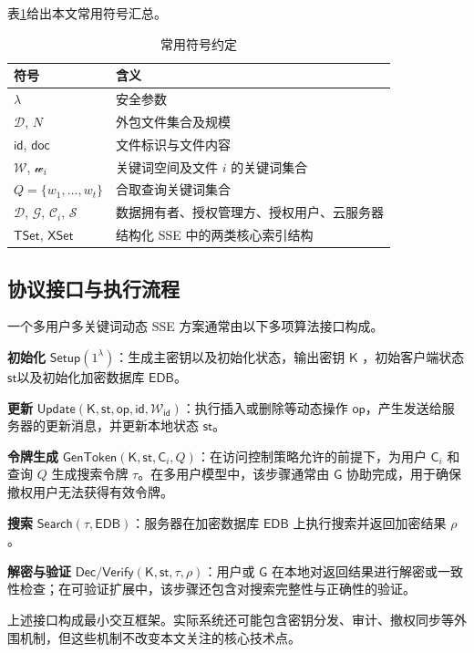 表\ref{tab:notation}给出本文常用符号汇总。
\begin{table}[t]
\centering
\caption{常用符号约定}
\label{tab:notation}
\begin{tabular}{ll}
\hline
符号 & 含义\\
\hline
$\lambda$ & 安全参数\\
$\mathcal{D}$, $N$ & 外包文件集合及规模\\
$\mathsf{id}$, $\mathsf{doc}$ & 文件标识与文件内容\\
$\mathcal{W}$, $\mathcal{w}_i$ & 关键词空间及文件 $i$ 的关键词集合\\
$Q=\{w_1,\ldots,w_t\}$ & 合取查询关键词集合\\
$\mathcal{D}$, $\mathcal{G}$, $\mathcal{C}_i$, $\mathcal{S}$ & 数据拥有者、授权管理方、授权用户、云服务器\\
$\mathsf{TSet}$, $\mathsf{XSet}$ & 结构化 SSE 中的两类核心索引结构\\
\hline
\end{tabular}
\end{table}

\subsection{协议接口与执行流程}
一个多用户多关键词动态 SSE 方案通常由以下多项算法接口构成。

\textbf{初始化} $\mathsf{Setup}(1^\lambda)$：生成主密钥以及初始化状态，输出密钥 $\mathsf{K}$ ，初始客户端状态 $\mathsf{st}$以及初始化加密数据库 $\mathsf{EDB}$。

\textbf{更新} $\mathsf{Update}(\mathsf{K},\mathsf{st},\mathsf{op},\mathsf{id},\mathcal{W}_{\mathsf{id}})$：执行插入或删除等动态操作 $\mathsf{op}$，产生发送给服务器的更新消息，并更新本地状态 $\mathsf{st}$。

\textbf{令牌生成} $\mathsf{GenToken}(\mathsf{K},\mathsf{st},\mathsf{C}_i,Q)$：在访问控制策略允许的前提下，为用户 $\mathsf{C}_i$ 和查询 $Q$ 生成搜索令牌 $\tau$。在多用户模型中，该步骤通常由 $\mathsf{G}$ 协助完成，用于确保撤权用户无法获得有效令牌。

\textbf{搜索} $\mathsf{Search}(\tau,\mathsf{EDB})$：服务器在加密数据库 $\mathsf{EDB}$ 上执行搜索并返回加密结果 $\rho$。

\textbf{解密与验证} $\mathsf{Dec/Verify}(\mathsf{K},\mathsf{st},\tau,\rho)$：用户或 $\mathsf{G}$ 在本地对返回结果进行解密或一致性检查；在可验证扩展中，该步骤还包含对搜索完整性与正确性的验证。

上述接口构成最小交互框架。实际系统还可能包含密钥分发、审计、撤权同步等外围机制，但这些机制不改变本文关注的核心技术点。

